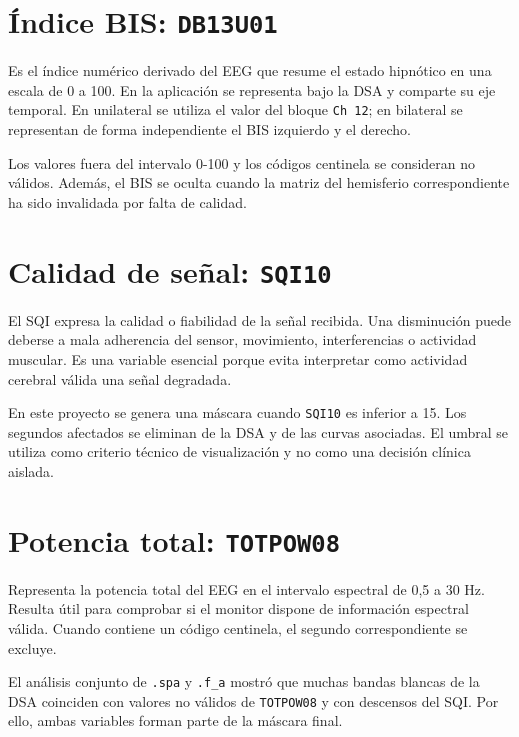 \documentclass[
  spanish,
  a4paper,
  12pt,
  twoside]{memoir}
\begin{document}
\section{\texorpdfstring{Índice BIS:
\texttt{DB13U01}}{Índice BIS: DB13U01}}\label{uxedndice-bis-db13u01}

Es el índice numérico derivado del EEG que resume el estado hipnótico en
una escala de 0 a 100. En la aplicación se representa bajo la DSA y
comparte su eje temporal. En unilateral se utiliza el valor del bloque
\texttt{Ch\ 12}; en bilateral se representan de forma independiente el
BIS izquierdo y el derecho.

Los valores fuera del intervalo 0-100 y los códigos centinela se
consideran no válidos. Además, el BIS se oculta cuando la matriz del
hemisferio correspondiente ha sido invalidada por falta de calidad.

\section{\texorpdfstring{Calidad de señal:
\texttt{SQI10}}{Calidad de señal: SQI10}}\label{calidad-de-seuxf1al-sqi10}

El SQI expresa la calidad o fiabilidad de la señal recibida. Una
disminución puede deberse a mala adherencia del sensor, movimiento,
interferencias o actividad muscular. Es una variable esencial porque
evita interpretar como actividad cerebral válida una señal degradada.

En este proyecto se genera una máscara cuando \texttt{SQI10} es inferior
a 15. Los segundos afectados se eliminan de la DSA y de las curvas
asociadas. El umbral se utiliza como criterio técnico de visualización y
no como una decisión clínica aislada.

\section{\texorpdfstring{Potencia total:
\texttt{TOTPOW08}}{Potencia total: TOTPOW08}}\label{potencia-total-totpow08}

Representa la potencia total del EEG en el intervalo espectral de 0,5 a
30 Hz. Resulta útil para comprobar si el monitor dispone de información
espectral válida. Cuando contiene un código centinela, el segundo
correspondiente se excluye.

El análisis conjunto de \texttt{.spa} y \texttt{.f\_a} mostró que muchas
bandas blancas de la DSA coinciden con valores no válidos de
\texttt{TOTPOW08} y con descensos del SQI. Por ello, ambas variables
forman parte de la máscara final.
\end{document}
